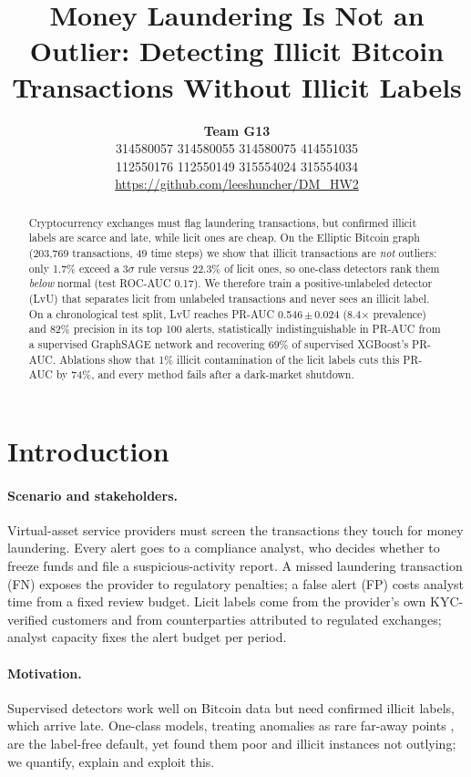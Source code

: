 \documentclass[11pt]{article}
\title{Money Laundering Is Not an Outlier: Detecting Illicit Bitcoin Transactions Without Illicit Labels}
\author{
  \textbf{Team G13} \\
  \zh{李尚哲} 314580057 \quad \zh{呂丞頤} 314580055 \quad \zh{黃駿甯} 314580075 \quad \zh{吳美真} 414551035 \\
  \zh{孫傅康} 112550176 \quad \zh{傅維雨} 112550149 \quad \zh{張凱華} 315554024 \quad \zh{李玠廷} 315554034 \\
  \url{https://github.com/leeshuncher/DM_HW2}
}
\newcommand{\ours}{LvU}
\begin{document}
\maketitle

\begin{abstract}
Cryptocurrency exchanges must flag laundering transactions, but confirmed illicit labels are scarce and late, while licit ones are cheap.
On the Elliptic Bitcoin graph (203,769 transactions, 49 time steps) we show that illicit transactions are \emph{not} outliers: only 1.7\% exceed a 3$\sigma$ rule versus 22.3\% of licit ones, so one-class detectors rank them \emph{below} normal (test ROC-AUC 0.17).
We therefore train a positive-unlabeled detector (\ours{}) that separates licit from unlabeled transactions and never sees an illicit label.
On a chronological test split, \ours{} reaches PR-AUC 0.546\,$\pm$\,0.024 (8.4$\times$ prevalence) and 82\% precision in its top 100 alerts, statistically indistinguishable in PR-AUC from a supervised GraphSAGE network and recovering 69\% of supervised XGBoost's PR-AUC.
Ablations show that 1\% illicit contamination of the licit labels cuts this PR-AUC by 74\%, and every method fails after a dark-market shutdown.
\end{abstract}

\section{Introduction}

\paragraph{Scenario and stakeholders.}
Virtual-asset service providers must screen the transactions they touch for money laundering.
Every alert goes to a compliance analyst, who decides whether to freeze funds and file a suspicious-activity report.
A missed laundering transaction (FN) exposes the provider to regulatory penalties; a false alert (FP) costs analyst time from a fixed review budget.
Licit labels come from the provider's own KYC-verified customers and from counterparties attributed to regulated exchanges; analyst capacity fixes the alert budget per period.

\paragraph{Motivation.}
Supervised detectors work well on Bitcoin data \citep{weber2019aml} but need confirmed illicit labels, which arrive late.
One-class models, treating anomalies as rare far-away points \citep{chandola2009survey}, are the label-free default, yet \citet{lorenz2020label} found them poor and illicit instances not outlying; we quantify, explain and exploit this.
\end{document}
